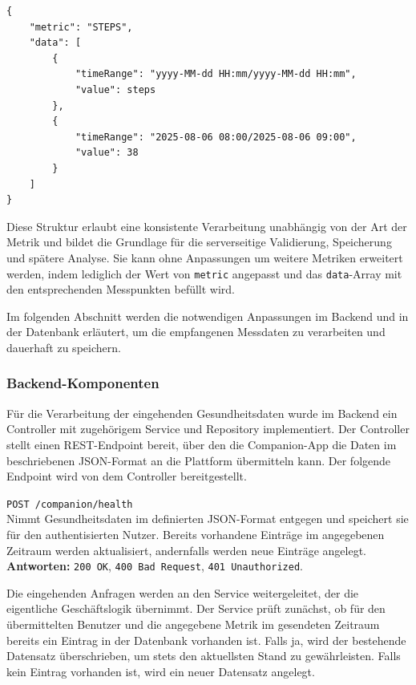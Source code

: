 \documentclass[12pt,a4paper]{report}
\begin{document}
\begin{verbatim}
{
    "metric": "STEPS",
    "data": [
        {
            "timeRange": "yyyy-MM-dd HH:mm/yyyy-MM-dd HH:mm",
            "value": steps
        },
        {
            "timeRange": "2025-08-06 08:00/2025-08-06 09:00",
            "value": 38
        }
    ]
}
\end{verbatim}

Diese Struktur erlaubt eine konsistente Verarbeitung unabhängig von der Art der Metrik und bildet die Grundlage für die
serverseitige Validierung, Speicherung und spätere Analyse. Sie kann ohne Anpassungen um weitere Metriken erweitert werden,
indem lediglich der Wert von \texttt{metric} angepasst und das \texttt{data}-Array mit den entsprechenden Messpunkten befüllt
wird.

Im folgenden Abschnitt werden die notwendigen Anpassungen im Backend und in der Datenbank erläutert, um die empfangenen
Messdaten zu verarbeiten und dauerhaft zu speichern.

\subsubsection{Backend-Komponenten}

Für die Verarbeitung der eingehenden Gesundheitsdaten wurde im Backend ein Controller mit zugehörigem Service und Repository
implementiert. Der Controller stellt einen REST-Endpoint bereit, über den die Companion-App die Daten im beschriebenen 
JSON-Format an die Plattform übermitteln kann. Der folgende Endpoint wird von dem Controller bereitgestellt.

\begin{description}
  \item \texttt{POST /companion/health} \\
        Nimmt Gesundheitsdaten im definierten JSON-Format entgegen und speichert sie für den authentisierten Nutzer. 
        Bereits vorhandene Einträge im angegebenen Zeitraum werden aktualisiert, andernfalls werden neue Einträge angelegt. \\
        \textbf{Antworten:} \texttt{200 OK}, \texttt{400 Bad Request}, \texttt{401 Unauthorized}.
\end{description}

Die eingehenden Anfragen werden an den Service weitergeleitet, der die eigentliche Geschäftslogik übernimmt. Der Service prüft
zunächst, ob für den übermittelten Benutzer und die angegebene Metrik im gesendeten Zeitraum bereits ein Eintrag in der Datenbank
vorhanden ist. Falls ja, wird der bestehende Datensatz überschrieben, um stets den aktuellsten Stand zu gewährleisten. Falls kein
Eintrag vorhanden ist, wird ein neuer Datensatz angelegt.  
\end{document}
